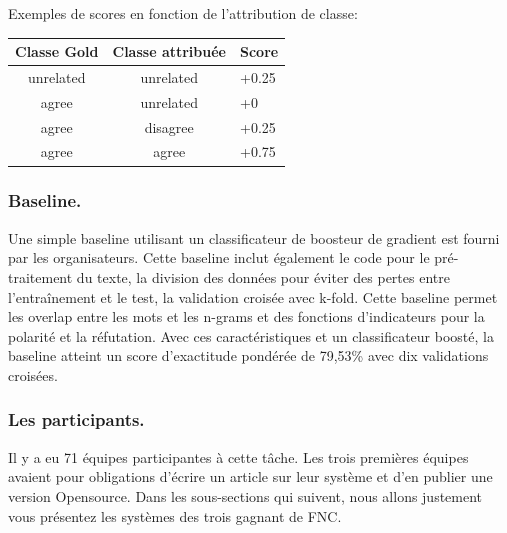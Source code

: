 \documentclass[onecolumn, 12pt]{article}
\begin{document}
Exemples de scores en fonction de l'attribution de classe:

\begin{center}
 \begin{tabular}{| c | c || l | }
  \hline
  \textbf{Classe Gold} & \textbf{Classe attribuée} & \textbf{Score} \\
  \hline
  unrelated            & unrelated                  & +0.25          \\
  agree                & unrelated                  & +0             \\
  agree                & disagree                   & +0.25          \\
  agree                & agree                      & +0.75          \\
  \hline
 \end{tabular}
\end{center}

\subsubsection{Baseline.}
Une simple baseline utilisant un classificateur de boosteur de gradient est fourni par les organisateurs.
Cette baseline inclut également le code pour le pré-traitement du texte, la division des données pour éviter des pertes entre l'entraînement et le test, la validation croisée avec k-fold.
Cette baseline permet les overlap entre les mots et les n-grams et des fonctions d'indicateurs pour la polarité et la réfutation.
Avec ces caractéristiques et un classificateur boosté, la baseline atteint un score d'exactitude pondérée de 79,53\% avec dix validations croisées.


\subsubsection{Les participants.}
Il y a eu 71 équipes participantes à cette tâche. Les trois premières équipes avaient pour obligations d'écrire un article sur leur système et d'en publier une version Opensource.
Dans les sous-sections qui suivent, nous allons justement vous présentez les systèmes des trois gagnant de FNC.

\end{document}
